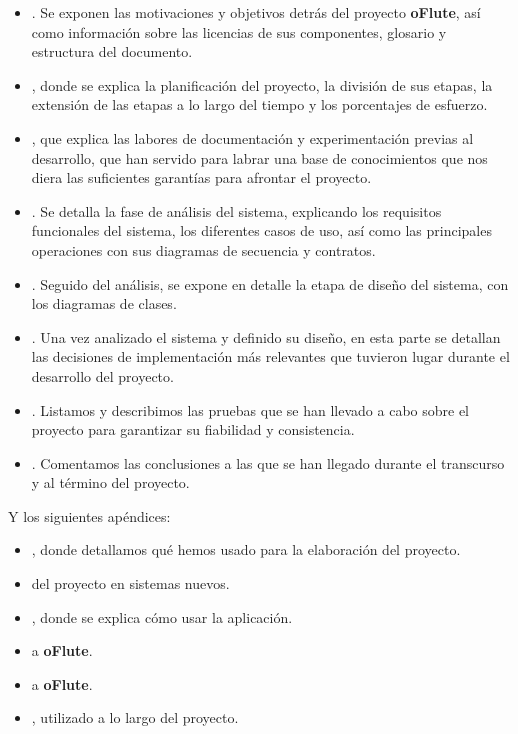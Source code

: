 \begin{itemize}
\item \textbf{}. Se exponen las motivaciones y
  objetivos detrás del proyecto \textbf{oFlute}, así como información sobre las
  licencias de sus componentes, glosario y estructura del documento.
\item \textbf{}, donde se explica la planificación del
  proyecto, la división de sus etapas, la extensión de las etapas a lo largo del
  tiempo y los porcentajes de esfuerzo.
\item \textbf{}, que explica las labores de
  documentación y experimentación previas al desarrollo, que han servido para
  labrar una base de conocimientos que nos diera las suficientes garantías para
  afrontar el proyecto.
\item \textbf{}. Se detalla la fase de análisis del
  sistema, explicando los requisitos funcionales del sistema, los diferentes
  casos de uso, así como las principales operaciones con sus diagramas de
  secuencia y contratos.
\item \textbf{}. Seguido del análisis, se expone en detalle
  la etapa de diseño del sistema, con los diagramas de clases.
\item \textbf{}. Una vez analizado el sistema y
  definido su diseño, en esta parte se detallan las decisiones de implementación
  más relevantes que tuvieron lugar durante el desarrollo del proyecto.
\item \textbf{}. Listamos y describimos las pruebas que se
  han llevado a cabo sobre el proyecto para garantizar su fiabilidad y
  consistencia.
\item \textbf{}. Comentamos las conclusiones a las
  que se han llegado durante el transcurso y al término del proyecto.
\end{itemize}

Y los siguientes apéndices:
\begin{itemize}
\item \textbf{}, donde detallamos qué hemos usado para la
  elaboración del proyecto.
\item \textbf{} del proyecto en sistemas nuevos.
\item \textbf{}, donde se explica cómo usar la aplicación.
\item \textbf{} a \textbf{oFlute}.
\item \textbf{} a \textbf{oFlute}.
\item \textbf{}, utilizado a lo
  largo del proyecto.
\end{itemize}

